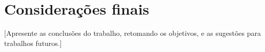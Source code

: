 \chapter{Considerações finais}
\label{cap:conclusao}

[Apresente as conclusões do trabalho, retomando os objetivos, e as sugestões para trabalhos futuros.]
